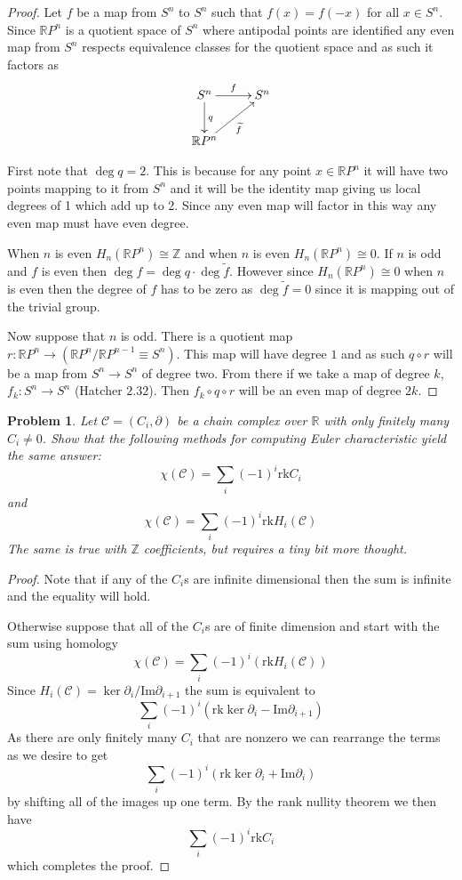 \documentclass[10pt]{article}
\newcommand{\sk}{\vskip 10mm}
\newcommand{\bb}[1]{\mathbb{#1}}
\newcommand{\rk}{\mathrm{rk}}
\theoremstyle{plain}
\newtheorem{problem}{Problem}
\theoremstyle{remark}
\begin{document}
\begin{proof}
  Let $f$ be a map from $S^n$ to $S^n$ such that $f(x)=f(-x)$ for all $x\in S^n$.
  Since $\bb{R}P^n$ is a quotient space of $S^n$ where antipodal points are
  identified any even map from $S^n$ respects equivalence classes for the
  quotient space and as such it factors as
  \[
    \xymatrix{
      S^n \ar[d]^q \ar[r]^f & S^n\\
      \bb{R}P^n \ar[ru]_{\widetilde{f}}
    }
  \]

  First note that $\deg q =2$. This is because
  for any point $x\in\bb{R}P^n$ it will have two points mapping to it from $S^n$ and
  it will be the identity map giving us local degrees of 1 which add up to 2. Since
  any even map will factor in this way any even map must have even degree.
  
  When $n$ is even $H_n(\bb{R}P^n)\cong\bb{Z}$ and when $n$ is even $H_n(\bb{R}P^n)\cong 0$.
  If $n$ is odd and $f$ is even then $\deg f = \deg q\cdot\deg \widetilde{f}$. However
  since $H_n(\bb{R}P^n)\cong 0$ when $n$ is even then the degree of $f$ has to be zero
  as $\deg \widetilde{f}=0$ since it is mapping out of the trivial group.

  Now suppose that $n$ is odd. There is a quotient map
  $r:\bb{R}P^n\rightarrow (\bb{R}P^n/\bb{R}P^{n-1}\equiv S^n)$. This map will have degree $1$ and
  as such $q\circ r$ will be a map from $S^n\rightarrow S^n$ of degree two. From there if we
  take a map of degree $k$, $f_k:S^n\rightarrow S^n$ (Hatcher $2.32$). Then $f_k\circ q\circ r$ will be
  an even map of degree $2k$.
\end{proof}

\sk

\begin{problem}
  Let $\mathcal{C}=(C_i,\partial)$ be a chain complex over $\bb{R}$ with only
  finitely many $C_i\neq 0$. Show that the following methods for computing
  Euler characteristic yield the same answer:
  \[ \chi(\mathcal{C})=\sum_i(-1)^i\mathrm{rk}C_i\]
  and
  \[ \chi(\mathcal{C})=\sum_i(-1)^i\mathrm{rk}H_i(\mathcal{C})\]
  The same is true with $\bb{Z}$ coefficients, but requires a tiny bit
  more thought.
\end{problem}

\begin{proof}
  Note that if any of the $C_i$s are infinite dimensional then the sum
  is infinite and the equality will hold.
  
  Otherwise suppose that all of the $C_i$s are of finite dimension and start
  with the sum using homology
  \[\chi(\mathcal{C})= \sum_i (-1)^i(\rk H_i(\mathcal{C})) \]
  Since $H_i(\mathcal{C})=\ker\partial_i/\mathrm{Im}\partial_{i+1}$ the sum is equivalent to
  \[ \sum_i(-1)^i(\rk\ker\partial_i-\mathrm{Im}\partial_{i+1}) \]
  As there are only finitely many $C_i$ that are nonzero we can rearrange
  the terms as we desire to get
  \[ \sum_i(-1)^i(\rk\ker\partial_i+\mathrm{Im}\partial_i)\]
  by shifting all of the images up one term. By the rank nullity theorem we
  then have
  \[ \sum_i(-1)^i\rk C_i \]
  which completes the proof.
\end{proof}

\end{document}
